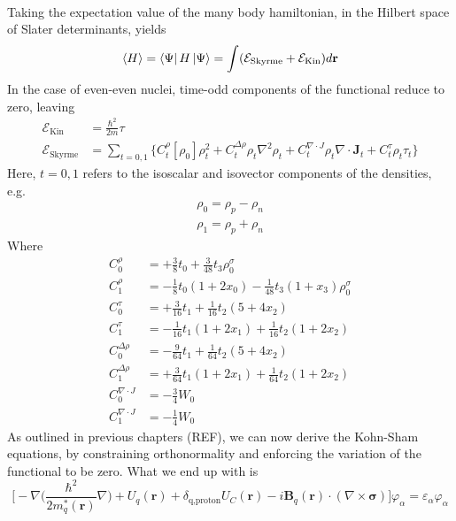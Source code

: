 \\Taking the expectation value of the many body hamiltonian, in the Hilbert space of Slater determinants, yields
\begin{equation}
    \expval{H} = \bra{\Psi} H \ket{\Psi} = \int (\mathcal E_\text{Skyrme} + \mathcal E_\text{Kin}) d\mathbf r
\end{equation}
In the case of even-even nuclei, time-odd components of the functional reduce to zero, leaving \cite{stevenson2019low}
\begin{align}
    \mathcal E_\text{Kin} &= \frac{\hbar^2}{2m}\tau \label{eq:kinfunc}\\
    \mathcal E_\text{Skyrme} &= \sum_{t=0,1}\bigg\{C_t^\rho [\rho_0]\rho_t^2+C_t^{\Delta \rho}\rho_t\nabla^2\rho_t+C_t^{\nabla\cdot J}\rho_t\nabla\cdot \mathbf J_t + C_t^\tau\rho_t\tau_t\bigg\}\label{eq:skfunc}
\end{align}
Here, $t=0,1$ refers to the isoscalar and isovector components of the densities, e.g.
\begin{align*}
    \rho_0 = \rho_p - \rho_n
    \\\rho_1 = \rho_p + \rho_n
\end{align*}
Where
\begin{align}
    C_0^\rho &= +\frac 3 8 t_0 + \frac 3 {48} t_3\rho_0^\sigma 
    \\C_1^\rho &= -\frac 1 8 t_0(1+2x_0)- \frac 1 {48} t_3(1+x_3)\rho_0^\sigma 
    \\C_0^\tau &= +\frac 3 {16} t_1 + \frac 1 {16} t_2 (5+4x_2)
    \\C_1^\tau &= -\frac 1 {16} t_1(1+2x_1)+\frac 1 {16}t_2(1+2x_2)
    \\C_0^{\Delta \rho} &= -\frac 9 {64}t_1+\frac 1 {64}t_2(5+4x_2)
    \\C_1^{\Delta \rho} &= +\frac 3 {64}t_1(1+2x_1)+\frac 1 {64}t_2(1+2x_2)
    \\C_0^{\nabla\cdot J} &= -\frac 3 4 W_0
    \\C_1^{\nabla\cdot J} &= -\frac 1 4 W_0
\end{align}
As outlined in previous chapters (REF), we can now derive the Kohn-Sham equations, by constraining orthonormality and enforcing the variation of the functional to be zero. What we end up with is
\begin{equation}
    \bigg[-\nabla\bigg(\frac{\hbar^2}{2m^{*}_q(\mathbf r)}\nabla \bigg) + U_q(\mathbf r) + \delta_{\text{q,proton}}U_C(\mathbf r)-i\mathbf B_q(\mathbf r)\cdot(\nabla \times \boldsymbol\sigma) \bigg]\varphi_\alpha=\varepsilon_\alpha\varphi_\alpha
\end{equation}
